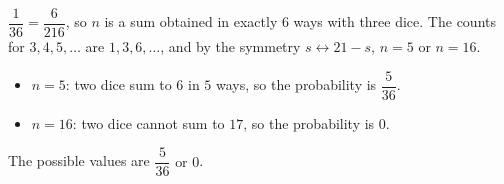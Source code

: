 $\dfrac1{36}=\dfrac6{216}$, so $n$ is a sum obtained in exactly $6$ ways with three dice. The counts for $3,4,5,\dots$ are $1,3,6,\dots$, and by the symmetry $s\leftrightarrow21-s$, $n=5$ or $n=16$.
\begin{itemize}
\item $n=5$: two dice sum to $6$ in $5$ ways, so the probability is $\dfrac5{36}$.
\item $n=16$: two dice cannot sum to $17$, so the probability is $0$.
\end{itemize}
The possible values are $\boxed{\dfrac5{36}\text{ or }0}$.
